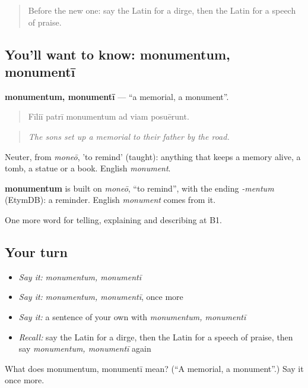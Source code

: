 \begin{quote}
Before the new one: say the Latin for a dirge, then the Latin for a speech of praise.
\end{quote}

\subsection*{You'll want to know: monumentum, monumentī}
\textbf{monumentum, monumentī} — \textquotedblleft{}a memorial, a monument\textquotedblright{}.

\begin{quote}
Fīliī patrī monumentum ad viam posuērunt.
\end{quote}

\begin{quote}
\emph{The sons set up a memorial to their father by the road.}
\end{quote}

Neuter, from \emph{moneō}, 'to remind' (taught): anything that keeps a memory alive, a tomb, a statue or a book. English \emph{monument}.

\begin{cousinweb}
\textbf{monumentum} is built on \emph{moneō}, \textquotedblleft{}to remind\textquotedblright{}, with the ending \emph{-mentum} (EtymDB): a reminder. English \emph{monument} comes from it.
\end{cousinweb}

\begin{grammarlens}[title={What you've built}]
One more word for telling, explaining and describing at B1.
\end{grammarlens}

\subsection*{Your turn}
\begin{itemize}
\raggedright
  \item \emph{Say it:} \emph{monumentum, monumentī}
  \item \emph{Say it:} \emph{monumentum, monumentī}, once more
  \item \emph{Say it:} a sentence of your own with \emph{monumentum, monumentī}
  \item \emph{Recall:} say the Latin for a dirge, then the Latin for a speech of praise, then say \emph{monumentum, monumentī} again
\end{itemize}

\begin{tcolorbox}[breakable,colback=teal!4,colframe=teal!35!black,title={Before you move on}]
What does monumentum, monumentī mean? (\textquotedblleft{}A memorial, a monument\textquotedblright{}.) Say it once more.
\end{tcolorbox}
